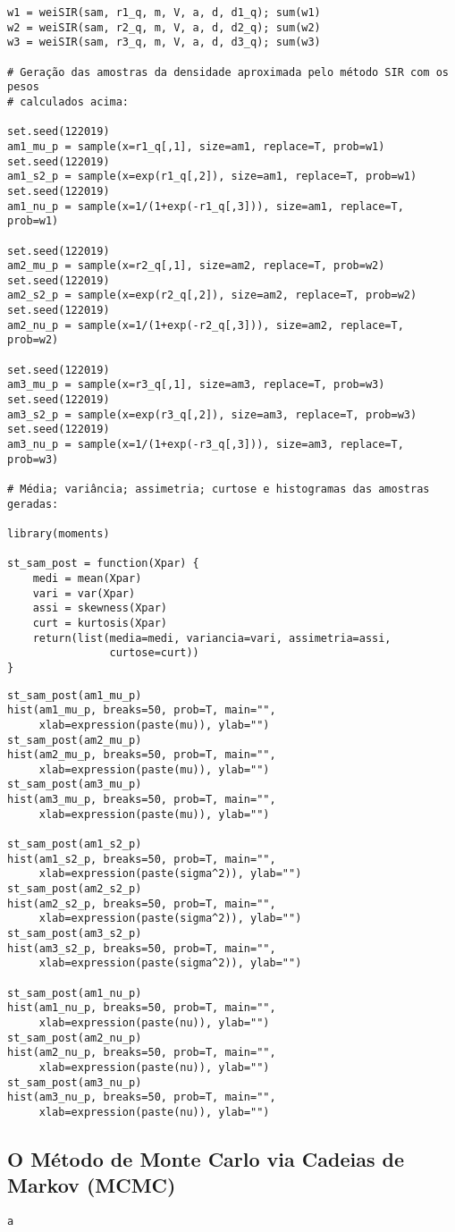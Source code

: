 \documentclass[12pt,reqno,a4paper,oneside]{article}
\begin{document}
\begin{verbatim}
w1 = weiSIR(sam, r1_q, m, V, a, d, d1_q); sum(w1)
w2 = weiSIR(sam, r2_q, m, V, a, d, d2_q); sum(w2)
w3 = weiSIR(sam, r3_q, m, V, a, d, d3_q); sum(w3)

# Geração das amostras da densidade aproximada pelo método SIR com os pesos
# calculados acima:

set.seed(122019)
am1_mu_p = sample(x=r1_q[,1], size=am1, replace=T, prob=w1)
set.seed(122019)
am1_s2_p = sample(x=exp(r1_q[,2]), size=am1, replace=T, prob=w1)
set.seed(122019)
am1_nu_p = sample(x=1/(1+exp(-r1_q[,3])), size=am1, replace=T, prob=w1)

set.seed(122019)
am2_mu_p = sample(x=r2_q[,1], size=am2, replace=T, prob=w2)
set.seed(122019)
am2_s2_p = sample(x=exp(r2_q[,2]), size=am2, replace=T, prob=w2)
set.seed(122019)
am2_nu_p = sample(x=1/(1+exp(-r2_q[,3])), size=am2, replace=T, prob=w2)

set.seed(122019)
am3_mu_p = sample(x=r3_q[,1], size=am3, replace=T, prob=w3)
set.seed(122019)
am3_s2_p = sample(x=exp(r3_q[,2]), size=am3, replace=T, prob=w3)
set.seed(122019)
am3_nu_p = sample(x=1/(1+exp(-r3_q[,3])), size=am3, replace=T, prob=w3)

# Média; variância; assimetria; curtose e histogramas das amostras geradas:

library(moments)

st_sam_post = function(Xpar) {
	medi = mean(Xpar)
	vari = var(Xpar)
	assi = skewness(Xpar)
	curt = kurtosis(Xpar)
	return(list(media=medi, variancia=vari, assimetria=assi,
				curtose=curt))
}
\end{verbatim}

\newpage

\begin{verbatim}
st_sam_post(am1_mu_p)
hist(am1_mu_p, breaks=50, prob=T, main="",
	 xlab=expression(paste(mu)), ylab="")
st_sam_post(am2_mu_p)
hist(am2_mu_p, breaks=50, prob=T, main="",
	 xlab=expression(paste(mu)), ylab="")
st_sam_post(am3_mu_p)
hist(am3_mu_p, breaks=50, prob=T, main="",
	 xlab=expression(paste(mu)), ylab="")

st_sam_post(am1_s2_p)
hist(am1_s2_p, breaks=50, prob=T, main="",
	 xlab=expression(paste(sigma^2)), ylab="")
st_sam_post(am2_s2_p)
hist(am2_s2_p, breaks=50, prob=T, main="",
	 xlab=expression(paste(sigma^2)), ylab="")
st_sam_post(am3_s2_p)
hist(am3_s2_p, breaks=50, prob=T, main="",
	 xlab=expression(paste(sigma^2)), ylab="")

st_sam_post(am1_nu_p)
hist(am1_nu_p, breaks=50, prob=T, main="",
	 xlab=expression(paste(nu)), ylab="")
st_sam_post(am2_nu_p)
hist(am2_nu_p, breaks=50, prob=T, main="",
	 xlab=expression(paste(nu)), ylab="")
st_sam_post(am3_nu_p)
hist(am3_nu_p, breaks=50, prob=T, main="",
	 xlab=expression(paste(nu)), ylab="")
\end{verbatim}

\subsection*{O Método de Monte Carlo via Cadeias de Markov (MCMC)}

\begin{verbatim}
a
\end{verbatim}
\end{document}

